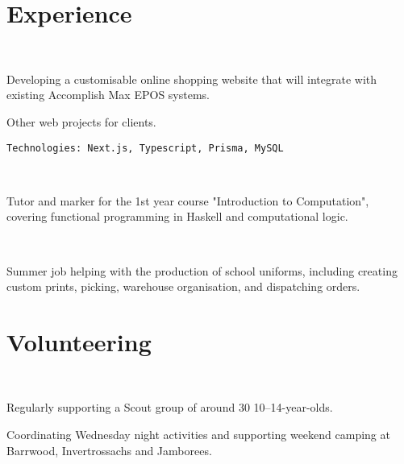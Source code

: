 \documentclass[]{hieudo-build}
\begin{document}
\begin{minipage}[t]{0.62\textwidth} 

\section{Experience}

\\
\vspace{0.9em} %
\begin{tightemize}
\item Developing a customisable online shopping website that will integrate with existing Accomplish Max EPOS systems.
\item Other web projects for clients.
\end{tightemize}
\verb|Technologies: Next.js, Typescript, Prisma, MySQL|
\sectionsep

\\
\begin{tightemize}
\item Tutor and marker for the 1st year course "Introduction to Computation", covering functional programming in Haskell and computational logic. 
\end{tightemize}
\sectionsep

 \\
\begin{tightemize}
\item Summer job helping with the production of school uniforms, including creating custom prints, picking, warehouse organisation, and dispatching orders.
\end{tightemize}
\sectionsep

\section{Volunteering}

 \\
\begin{tightemize}
\item Regularly supporting a Scout group of around 30 10–14-year-olds.
\item Coordinating Wednesday night activities and supporting weekend camping at Barrwood, Invertrossachs and Jamborees.
\end{tightemize}
\sectionsep


\end{minipage}
\end{document}
